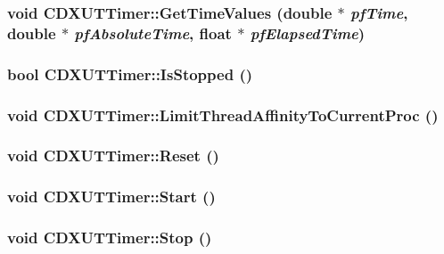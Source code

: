 \label{class_c_d_x_u_t_timer_a48c372d2d7ba669872d4a77d46aec33b}
\hypertarget{class_c_d_x_u_t_timer_a1e8c30855b6baab4993edafba1cca65c}{
\subsubsection[{GetTimeValues}]{\setlength{\rightskip}{0pt plus 5cm}void CDXUTTimer::GetTimeValues (double $\ast$ {\em pfTime}, \/  double $\ast$ {\em pfAbsoluteTime}, \/  float $\ast$ {\em pfElapsedTime})}}
\label{class_c_d_x_u_t_timer_a1e8c30855b6baab4993edafba1cca65c}
\hypertarget{class_c_d_x_u_t_timer_a97fbd0e9bbc85c7369df4b1556713751}{
\subsubsection[{IsStopped}]{\setlength{\rightskip}{0pt plus 5cm}bool CDXUTTimer::IsStopped ()}}
\label{class_c_d_x_u_t_timer_a97fbd0e9bbc85c7369df4b1556713751}
\hypertarget{class_c_d_x_u_t_timer_a0e07e5d07c8521dac1b8299c4271742e}{
\subsubsection[{LimitThreadAffinityToCurrentProc}]{\setlength{\rightskip}{0pt plus 5cm}void CDXUTTimer::LimitThreadAffinityToCurrentProc ()}}
\label{class_c_d_x_u_t_timer_a0e07e5d07c8521dac1b8299c4271742e}
\hypertarget{class_c_d_x_u_t_timer_adc40e951f6157dc82883294a19f8e04b}{
\subsubsection[{Reset}]{\setlength{\rightskip}{0pt plus 5cm}void CDXUTTimer::Reset ()}}
\label{class_c_d_x_u_t_timer_adc40e951f6157dc82883294a19f8e04b}
\hypertarget{class_c_d_x_u_t_timer_a970f9d5dc0b3b84f6445ec756c188f4b}{
\subsubsection[{Start}]{\setlength{\rightskip}{0pt plus 5cm}void CDXUTTimer::Start ()}}
\label{class_c_d_x_u_t_timer_a970f9d5dc0b3b84f6445ec756c188f4b}
\hypertarget{class_c_d_x_u_t_timer_a6e0b8b06ade854d7bc8f190cee75de11}{
\subsubsection[{Stop}]{\setlength{\rightskip}{0pt plus 5cm}void CDXUTTimer::Stop ()}}
\label{class_c_d_x_u_t_timer_a6e0b8b06ade854d7bc8f190cee75de11}



